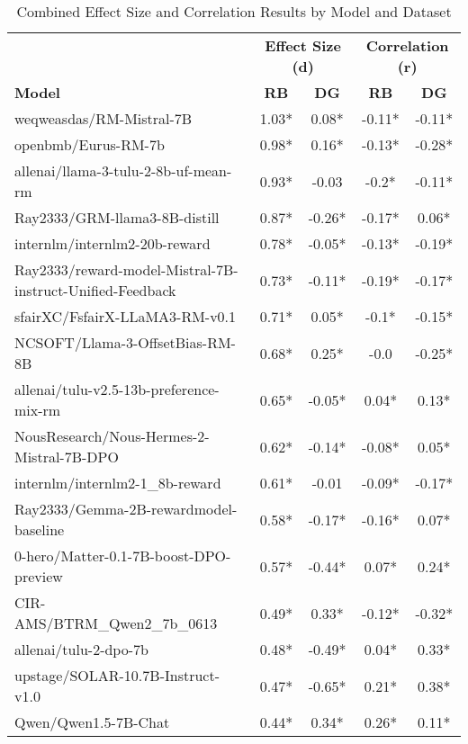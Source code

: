 \begin{table*}[htp]
\centering
\small
\begin{tabular}{lcc|cc}
\toprule
 & \multicolumn{2}{c}{\textbf{Effect Size (d)}} & \multicolumn{2}{c}{\textbf{Correlation (r)}} \\
\cmidrule(lr){2-3} \cmidrule(lr){4-5}
\textbf{Model} & \textbf{RB} & \textbf{DG} & \textbf{RB} & \textbf{DG} \\
\midrule
weqweasdas/RM-Mistral-7B & 1.03* & 0.08* & -0.11* & -0.11* \\
openbmb/Eurus-RM-7b & 0.98* & 0.16* & -0.13* & -0.28* \\
allenai/llama-3-tulu-2-8b-uf-mean-rm & 0.93* & -0.03 & -0.2* & -0.11* \\
Ray2333/GRM-llama3-8B-distill & 0.87* & -0.26* & -0.17* & 0.06* \\
internlm/internlm2-20b-reward & 0.78* & -0.05* & -0.13* & -0.19* \\
Ray2333/reward-model-Mistral-7B-instruct-Unified-Feedback & 0.73* & -0.11* & -0.19* & -0.17* \\
sfairXC/FsfairX-LLaMA3-RM-v0.1 & 0.71* & 0.05* & -0.1* & -0.15* \\
NCSOFT/Llama-3-OffsetBias-RM-8B & 0.68* & 0.25* & -0.0 & -0.25* \\
allenai/tulu-v2.5-13b-preference-mix-rm & 0.65* & -0.05* & 0.04* & 0.13* \\
NousResearch/Nous-Hermes-2-Mistral-7B-DPO & 0.62* & -0.14* & -0.08* & 0.05* \\
internlm/internlm2-1\_8b-reward & 0.61* & -0.01 & -0.09* & -0.17* \\
Ray2333/Gemma-2B-rewardmodel-baseline & 0.58* & -0.17* & -0.16* & 0.07* \\
0-hero/Matter-0.1-7B-boost-DPO-preview & 0.57* & -0.44* & 0.07* & 0.24* \\
CIR-AMS/BTRM\_Qwen2\_7b\_0613 & 0.49* & 0.33* & -0.12* & -0.32* \\
allenai/tulu-2-dpo-7b & 0.48* & -0.49* & 0.04* & 0.33* \\
upstage/SOLAR-10.7B-Instruct-v1.0 & 0.47* & -0.65* & 0.21* & 0.38* \\
Qwen/Qwen1.5-7B-Chat & 0.44* & 0.34* & 0.26* & 0.11* \\
\bottomrule
\end{tabular}
\normalsize
\caption{Combined Effect Size and Correlation Results by Model and Dataset}
\label{tab:combined_results}
\end{table*}
